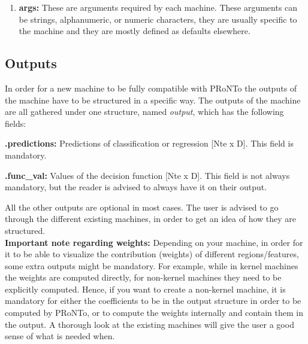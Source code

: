 \begin{enumerate}
\ei

Irrespective of the original type of the data (NIfTI, MEEG or .mat), the data are extracted and/or converted to the \textit{d} structure. While in .mat you could visualize your data right from the start, in the cases of NIfti and MEEG there is no PRoNTo function that lets you visualize your data. A test \textit{d} structure is provided inside the \textit{PRoNTo/machines/new\_machine} folder to help the readers visualize better how the input structure is.

\item \textbf{args:} These are arguments required by each machine. These arguments can be strings, alphanumeric, or numeric characters, they are usually specific to the machine and they are mostly defined as defaults elsewhere.

\end{enumerate}

\subsection{Outputs}
\label{ssecc:outputs}

In order for a new machine to be fully compatible with PRoNTo the outputs of the machine have to be structured in a specific way. The outputs of the machine are all gathered under one structure, named \textit{output}, which has the following fields:

\bi
\item \textbf{.predictions:} Predictions of classification or regression [Nte x D]. This field is mandatory.

\item \textbf{.func\_val:} Values of the decision function [Nte x D]. This field is not always mandatory, but the reader is advised to always have it on their output.
\ei

All the other outputs are optional in most cases. The user is advised to go through the different existing machines, in order to get an idea of how they are structured.
\\

\noindent \textbf{Important note regarding weights:} Depending on your machine, in order for it to be able to visualize the contribution (weights) of different regions/features, some extra outputs might be mandatory. For example, while in kernel machines the weights are computed directly, for non-kernel machines they need to be explicitly computed. Hence, if you want to create a non-kernel machine, it is mandatory for either the coefficients to be in the output structure in order to be computed by PRoNTo, or to compute the weights internally and contain them in the output. A thorough look at the existing machines will give the user a good sense of what is needed when.


